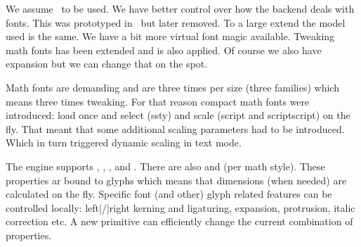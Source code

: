 \stoptitle

\starttitle[title=The \LMTX\ font model]

\startitemize
    \startitem
        We assume \LUAMETATEX\ to be used.
    \stopitem
    \startitem
        We have better control over how the backend deals with fonts. This
        was prototyped in \MKIV\ but later removed.
    \stopitem
    \startitem
        To a large extend the model used is the same.
    \stopitem
    \startitem
        We have a bit more virtual font magic available.
    \stopitem
    \startitem
        Tweaking math fonts has been extended and is also applied.
    \stopitem
     \startitem
        Of course we also have expansion but we can change that on the spot.
     \stopitem
\stopitemize

\stoptitle

\starttitle[title=Some new engine features]
     \startitem
        Math fonts are demanding and are  three times per size
        (three families) which means three times tweaking.
     \stopitem
     \startitem
        For that reason compact math fonts were introduced: load once and select (ssty)
        and scale (script and scriptscript) on the fly.
     \stopitem
     \startitem
        That meant that some additional scaling parameters had to be introduced.
     \stopitem
     \startitem
        Which in turn triggered dynamic scaling in text mode.
     \stopitem
\stoptitle

\starttitle[title=Some new engine features]

\startitemize
    \startitem
        The engine supports \typ {\glyphscale}, \typ {\glyphxscale}, \typ
        {\glyphyscale}, \typ {\glyphslant} and \typ {\glyphweight}.
    \stopitem
    \startitem
        There are also \typ {\Umathxscale} and \typ {\Umathyscale} (per math
        style).
    \stopitem
    \startitem
        These properties ar bound to glyphs which means that dimensions (when
        needed) are calculated on the fly.
    \stopitem
    \startitem
        Specific font (and other) glyph related features can be controlled locally:
        left|/|right kerning and ligaturing, expansion, protrusion, italic correction
        etc.
    \stopitem
    \startitem
        A new primitive \typ {\fontspecdef} can efficiently change the current
        combination of properties.
    \stopitem
\stopitemize

\stoptitle

\starttitle[title=Intermezzo: glyph nodes]

